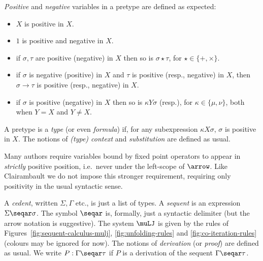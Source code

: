 \begin{defn}
    \emph{Positive} and \emph{negative} variables in a pretype are defined as expected:
\begin{itemize}     
\item $X$ is positive in $X$.
        \item $1$ is positive and negative in $X$.
        \item if $\sigma,\tau$ are positive (negative) in $X$ then so is $\sigma \star \tau$, for $\star \in \{+,\times\}$.
        \item if $\sigma$ is negative (positive) in $X$ and $\tau $ is positive (resp., negative) in $X$, then $\sigma \to \tau$ is positive (resp., negative) in $X$.
        \item if $\sigma$ is positive (negative) in $X$ then so is $\kappa Y \sigma$ (resp.), for $\kappa \in \{\mu,\nu\}$, both when $Y=X$ and $Y \neq X$.
    \end{itemize}
A pretype is a \emph{type} (or even \emph{formula}) if, for any subexpression $\kappa X \sigma$, $\sigma$ is positive in $X$.
The notions of \emph{(type) context} and \emph{substitution} are defined as usual. 
\end{defn}

\begin{remark}
    Many authors require variables bound by fixed point operators to appear in \emph{strictly} positive position, i.e.\ never under the left-scope of $\arrow$.
    Like Clairambault \cite{Clairambault09,Clairambault13interleaving} we do not impose this stronger requirement, requiring only positivity in the usual syntactic sense.
\end{remark}

\begin{defn}
A \emph{cedent}, written $\Sigma, \Gamma$ etc., is just a list of types. 
A \emph{sequent} is an expression $\Sigma \seqar \sigma$.
The symbol $\seqar$ is, formally, just a syntactic delimiter (but the arrow notation is suggestive).
The system $\muLJ$ is given by the rules of Figures~\ref{fig:sequent-calculus-mulj}, \ref{fig:unfolding-rules} and \ref{fig:co-iteration-rules} (colours may be ignored for now).
The notions of \emph{derivation} (or \emph{proof}) are defined as usual. 
We write $P: \Gamma \seqar \tau$ if $P$ is a derivation of the sequent $\Gamma \seqar \tau$. 
\end{defn}

